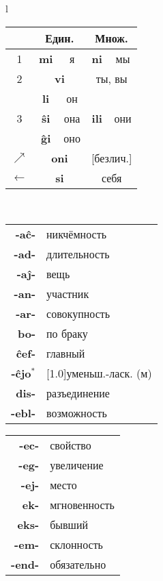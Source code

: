 \documentclass{article}
\def\b#1{\textbf{#1}}
\def\g{\cellcolor{gray!25}}
\begin{document}
\begin{center}
\begin{tabular}{l}
\begin{tabular}{|c|cc|cc|}
\hline
\g & \multicolumn{2}{c|}{\g Един.} & \multicolumn{2}{c|}{\g Множ.} \\
\hline
\g 1 & \b{mi} & я & \b{ni} & мы \\
\hline
\g 2 & \multicolumn{2}{c}{\b{vi}} & \multicolumn{2}{c|}{ты, вы} \\
\hline
\g & \b{li} & он & & \\
\cline{2-3}
\g 3 & \b{ŝi} & она & \b{ili} & они \\
\cline{2-3}
\g & \b{ĝi} & оно & & \\	 
\hline
\g $\nearrow$ & \multicolumn{2}{c}{\b{oni}} & \multicolumn{2}{c|}{[безлич.]} \\
\hline
\g $\leftarrow$ & \multicolumn{2}{c}{\b{si}} & \multicolumn{2}{c|}{себя} \\
\hline
\end{tabular}\,
\begin{tabular}{>{\bfseries}rl}
-aĉ- & никчёмность \\
-ad- & длительность \\
-aĵ- & вещь \\
-an- & участник \\
-ar- & совокупность \\
bo- & по браку \\
ĉef- & главный \\
-ĉjo$^*$ & \scalebox{.75}[1.0]{уменьш.-ласк. (м)} \\
dis- & разъединение \\
-ebl- & возможность \\
\end{tabular}
\hspace{-0.75em}
\begin{tabular}{>{\bfseries}rl}
-ec- & свойство \\
-eg- & увеличение \\
-ej- & место \\
ek- & мгновенность \\
eks- & бывший \\
-em- & склонность \\
-end- & обязательно \\

\end{tabular}
\end{tabular}
\end{center}
\end{document}
